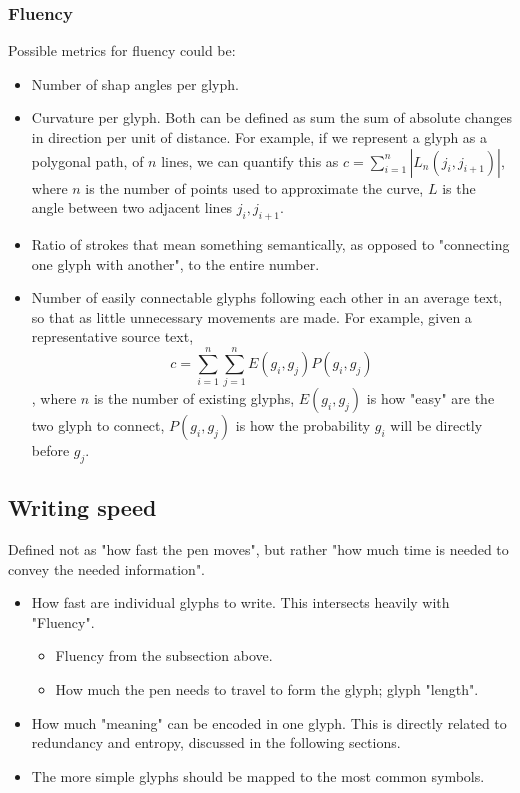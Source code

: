 \documentclass{vgtc}                          %
\begin{document}
\subsubsection{Fluency}
Possible metrics for fluency could be:
\begin{itemize}
        \item Number of shap angles per glyph.
        \item Curvature per glyph. Both can be defined as sum the sum of absolute changes in direction per unit of distance. For example, if we represent a glyph as a polygonal path, of \(n\) lines, we can quantify this as
                \(c=\sum_{i=1}^n|L_n(j_i, j_{i+1})|\), where \(n\) is the number of  points used to approximate the curve, \(L\) is the angle between two adjacent lines  \(j_i, j_{i+1}\).
        \item Ratio of strokes that mean something semantically, as opposed to "connecting one glyph with another", to the entire number.
        \item Number of easily connectable glyphs following each other in an average text, so that as little unnecessary movements are made. For example, given a representative source text, 
                \[c=\sum_{i=1}^n\sum_{j=1}^nE(g_i, g_j)P(g_i,g_j)\], where \(n\) is the number of existing glyphs, \(E(g_i, g_j)\) is how "easy" are the two glyph to connect, \(P(g_i, g_j)\) is how the probability \(g_i\) will be directly before \(g_j\).
\end{itemize}


\subsection{Writing speed}
Defined not as "how fast the pen moves", but rather "how much time is needed to convey the needed information".

\begin{itemize}
        \item How fast are individual glyphs to write. This intersects heavily with "Fluency".
                \begin{itemize}
                        \item Fluency from the subsection above.
                        \item How much the pen needs to travel to form the glyph; glyph "length".
                \end{itemize}
        \item How much "meaning" can be encoded in one glyph. This is directly related to redundancy and entropy, discussed in the following sections.
        \item The more simple glyphs should be mapped to the most common symbols.
\end{itemize}
\end{document}
